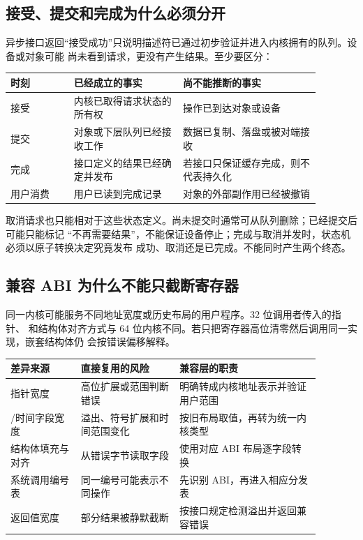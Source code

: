 \subsection{接受、提交和完成为什么必须分开}

异步接口返回“接受成功”只说明描述符已通过初步验证并进入内核拥有的队列。设备或对象可能
尚未看到请求，更没有产生结果。至少要区分：

\begin{longtable}{|L{0.18\linewidth}|L{0.31\linewidth}|L{0.39\linewidth}|}
\hline
时刻 & 已经成立的事实 & 尚不能推断的事实 \\ \hline
接受 & 内核已取得请求状态的所有权 & 操作已到达对象或设备 \\ \hline
提交 & 对象或下层队列已经接收工作 & 数据已复制、落盘或被对端接收 \\ \hline
完成 & 接口定义的结果已经确定并发布 & 若接口只保证缓存完成，则不代表持久化 \\ \hline
用户消费 & 用户已读到完成记录 & 对象的外部副作用已经被撤销 \\ \hline
\end{longtable}

取消请求也只能相对于这些状态定义。尚未提交时通常可从队列删除；已经提交后可能只能标记
“不再需要结果”，不能保证设备停止；完成与取消并发时，状态机必须以原子转换决定究竟发布
成功、取消还是已完成。不能同时产生两个终态。

\subsection{兼容 ABI 为什么不能只截断寄存器}

同一内核可能服务不同地址宽度或历史布局的用户程序。32 位调用者传入的指针、
和结构体对齐方式与 64 位内核不同。若只把寄存器高位清零然后调用同一实现，嵌套结构体仍
会按错误偏移解释。

\begin{longtable}{|L{0.20\linewidth}|L{0.28\linewidth}|L{0.40\linewidth}|}
\hline
差异来源 & 直接复用的风险 & 兼容层的职责 \\ \hline
指针宽度 & 高位扩展或范围判断错误 & 明确转成内核地址表示并验证用户范围 \\ \hline
{}/时间字段宽度 & 溢出、符号扩展和时间范围变化 & 按旧布局取值，再转为统一内核类型 \\ \hline
结构体填充与对齐 & 从错误字节读取字段 & 使用对应 ABI 布局逐字段转换 \\ \hline
系统调用编号表 & 同一编号可能表示不同操作 & 先识别 ABI，再进入相应分发表 \\ \hline
返回值宽度 & 部分结果被静默截断 & 按接口规定检测溢出并返回兼容错误 \\ \hline
\end{longtable}

